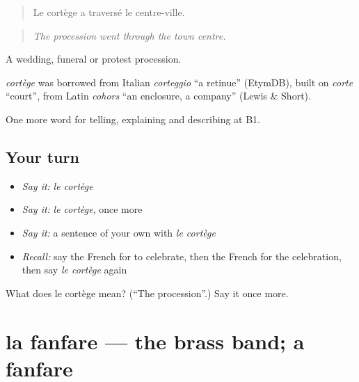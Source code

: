 \begin{quote}
Le cortège a traversé le centre-ville.
\end{quote}

\begin{quote}
\emph{The procession went through the town centre.}
\end{quote}

A wedding, funeral or protest procession.

\begin{cousinweb}
\emph{cortège} was borrowed from Italian \emph{corteggio} \textquotedblleft{}a retinue\textquotedblright{} (EtymDB), built on \emph{corte} \textquotedblleft{}court\textquotedblright{}, from Latin \emph{cohors} \textquotedblleft{}an enclosure, a company\textquotedblright{} (Lewis \& Short).
\end{cousinweb}

\begin{grammarlens}[title={What you've built}]
One more word for telling, explaining and describing at B1.
\end{grammarlens}

\subsection*{Your turn}
\begin{itemize}
\raggedright
  \item \emph{Say it:} \emph{le cortège}
  \item \emph{Say it:} \emph{le cortège}, once more
  \item \emph{Say it:} a sentence of your own with \emph{le cortège}
  \item \emph{Recall:} say the French for to celebrate, then the French for the celebration, then say \emph{le cortège} again
\end{itemize}

\begin{tcolorbox}[breakable,colback=teal!4,colframe=teal!35!black,title={Before you move on}]
What does le cortège mean? (\textquotedblleft{}The procession\textquotedblright{}.) Say it once more.
\end{tcolorbox}
\section[la fanfare]{la fanfare — the brass band; a fanfare}

\label{lesson:FR-C316-fanfare}



